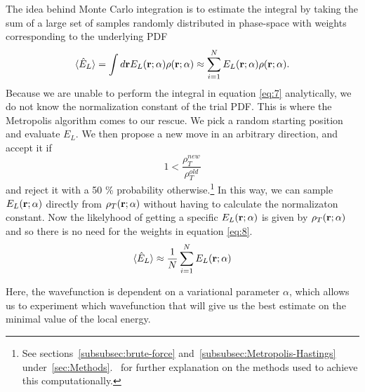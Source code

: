 \documentclass[
    a4paper, aps, twocolumn, floatfix, superscriptaddress,
    nofootinbib]{revtex4-1}
\begin{document}
The idea behind Monte Carlo integration is to estimate the integral by taking the sum of a large set of samples randomly distributed in phase-space with weights corresponding to the underlying PDF
\begin{equation}\label{eq:8}
    \langle \hat{E}_L \rangle = \int d\bold r E_L(\bold r; \alpha) \rho(\bold r; \alpha) \approx  \sum_{i=1}^{N} E_L(\bold r; \alpha) \rho(\bold r; \alpha).
\end{equation}
Because we are unable to perform the integral in equation \eqref{eq:7} analytically, we do not know the normalization constant of the trial PDF. This is where the Metropolis algorithm comes to our rescue. We pick a random starting position and evaluate $E_L$. We then propose a new move in an arbitrary direction, and accept it if 
\begin{equation}
    1<\frac{\rho_T^{new}}{\rho_T^{old}}
\end{equation}
and reject it with a 50 \% probability otherwise.\footnote{See sections~\ref{subsubsec:brute-force} and~\ref{subsubsec:Metropolis-Hastings} under~\ref{sec:Methods}.~ for further explanation on the methods used to achieve this computationally.} In this way, we can sample $E_L(\bold r; \alpha)$ directly from $\rho_T(\bold r; \alpha)$ without having to calculate the normalizaton constant. Now the likelyhood of getting a specific $E_L(\bold r; \alpha)$ is given by $\rho_T(\bold r; \alpha)$ and so there is no need for the weights in equation \eqref{eq:8}.
\begin{equation}
    \langle \hat{E}_L \rangle \approx \frac{1}{N} \sum_{i=1}^{N} E_L(\bold r; \alpha)
\end{equation}



\vspace{10}
Here, the wavefunction is dependent on a variational parameter $\alpha$, which allows us to experiment which wavefunction that will give us the best estimate on the minimal value of the local energy.
\end{document}
